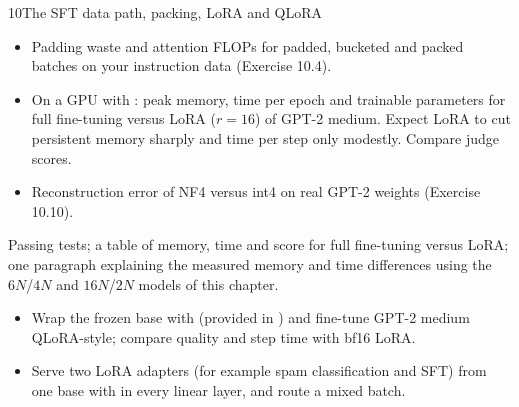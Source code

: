 \begin{labbox}{10}{The SFT data path, packing, LoRA and QLoRA}
\begin{itemize}
\item Padding waste and attention FLOPs for padded, bucketed and packed batches on your
instruction data (Exercise 10.4).
\item On a GPU with : peak memory, time per epoch and trainable parameters
for full fine-tuning versus LoRA ($r=16$) of GPT-2 medium. Expect LoRA to cut
persistent memory sharply and time per step only modestly. Compare judge scores.
\item Reconstruction error of NF4 versus int4 on real GPT-2 weights (Exercise 10.10).
\end{itemize}

Passing tests; a table of memory, time and score for full fine-tuning versus LoRA; one
paragraph explaining the measured memory and time differences using the $6N$/$4N$ and
$16N$/$2N$ models of this chapter.

\begin{itemize}
\item Wrap the frozen base with  (provided in )
and fine-tune GPT-2 medium QLoRA-style; compare quality and step time with bf16 LoRA.
\item Serve two LoRA adapters (for example spam classification and SFT) from one base
with  in every linear layer, and route a mixed batch.
\end{itemize}
\end{labbox}
